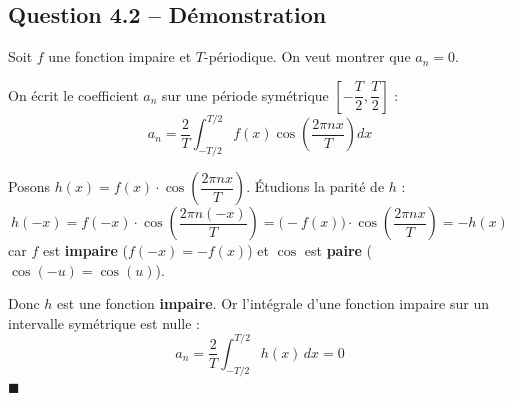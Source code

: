 \documentclass[12pt,a4paper]{article}
\begin{document}
\subsection*{Question 4.2 -- Démonstration}

\begin{repbox}
Soit $f$ une fonction impaire et $T$-périodique. On veut montrer que $a_n = 0$.

On écrit le coefficient $a_n$ sur une période symétrique $\left[-\dfrac{T}{2}, \dfrac{T}{2}\right]$ :
\[
    a_n = \frac{2}{T}\int_{-T/2}^{T/2} f(x)\cos\!\left(\frac{2\pi n x}{T}\right)dx
\]

Posons $h(x) = f(x)\cdot\cos\!\left(\dfrac{2\pi n x}{T}\right)$. Étudions la parité de $h$ :
\[
    h(-x) = f(-x)\cdot\cos\!\left(\frac{2\pi n (-x)}{T}\right) = \big(-f(x)\big)\cdot\cos\!\left(\frac{2\pi n x}{T}\right) = -h(x)
\]
car $f$ est \textbf{impaire} ($f(-x) = -f(x)$) et $\cos$ est \textbf{paire} ($\cos(-u) = \cos(u)$).

Donc $h$ est une fonction \textbf{impaire}. Or l'intégrale d'une fonction impaire sur un intervalle symétrique est nulle :
\[
    a_n = \frac{2}{T}\int_{-T/2}^{T/2} h(x)\,dx = 0
\]
\hfill $\blacksquare$
\end{repbox}
\end{document}
